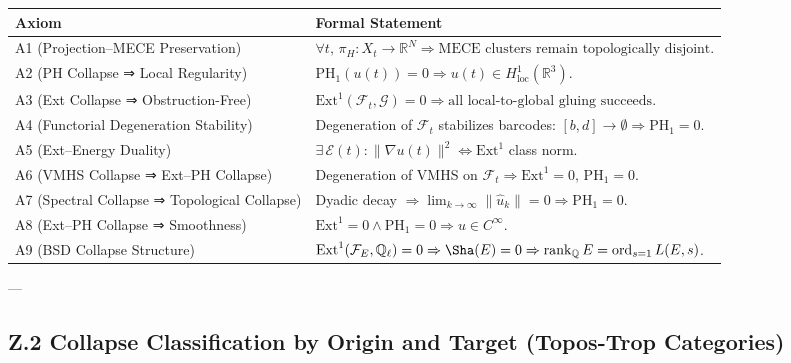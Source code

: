 \documentclass[11pt]{article}
\begin{document}
\begin{axiom}
\begin{axiom}
{{\begin{tabular}{ll}
\toprule
\textbf{Axiom} & \textbf{Formal Statement} \\
\midrule
A1 (Projection–MECE Preservation) & \( \forall t,\, \pi_H: X_t \to \mathbb{R}^N \Rightarrow \text{MECE clusters remain topologically disjoint} \). \\
A2 (PH Collapse ⇒ Local Regularity) & \( \mathrm{PH}_1(u(t)) = 0 \Rightarrow u(t) \in H^1_{\text{loc}}(\mathbb{R}^3) \). \\
A3 (Ext Collapse ⇒ Obstruction-Free) & \( \mathrm{Ext}^1(\mathcal{F}_t, \mathcal{G}) = 0 \Rightarrow \text{all local-to-global gluing succeeds} \). \\
A4 (Functorial Degeneration Stability) & Degeneration of \( \mathcal{F}_t \) stabilizes barcodes: \( [b,d] \to \emptyset \Rightarrow \mathrm{PH}_1 = 0 \). \\
A5 (Ext–Energy Duality) & \( \exists\, \mathcal{E}(t): \|\nabla u(t)\|^2 \Leftrightarrow \mathrm{Ext}^1 \) class norm. \\
A6 (VMHS Collapse ⇒ Ext–PH Collapse) & Degeneration of VMHS on \( \mathcal{F}_t \Rightarrow \mathrm{Ext}^1 = 0,\, \mathrm{PH}_1 = 0 \). \\
A7 (Spectral Collapse ⇒ Topological Collapse) & Dyadic decay \( \Rightarrow \lim_{k \to \infty} \|\hat{u}_k\| = 0 \Rightarrow \mathrm{PH}_1 = 0 \). \\
A8 (Ext–PH Collapse ⇒ Smoothness) & \( \mathrm{Ext}^1 = 0 \land \mathrm{PH}_1 = 0 \Rightarrow u \in C^\infty \). \\
A9 (BSD Collapse Structure) & \( \mathrm{Ext}^1(\mathcal{F}_E, \mathbb{Q}_\ell) = 0 \Rightarrow \Sha(E) = 0 \Rightarrow \operatorname{rank}_{\mathbb{Q}} E = \operatorname{ord}_{s=1} L(E, s) \). \\
\bottomrule
\end{tabular}

---

\subsection*{Z.2 Collapse Classification by Origin and Target (Topos-Trop Categories)}

}}
\end{axiom}
\end{axiom}
\end{document}
